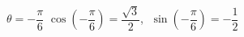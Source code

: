 {$\theta = -\dfrac{\pi}{6}$}
{$\cos\left(-\dfrac{\pi}{6}\right) = \dfrac{\sqrt{3}}{2}$, $\; \sin\left(-\dfrac{\pi}{6}\right) = -\dfrac{1}{2}$}
